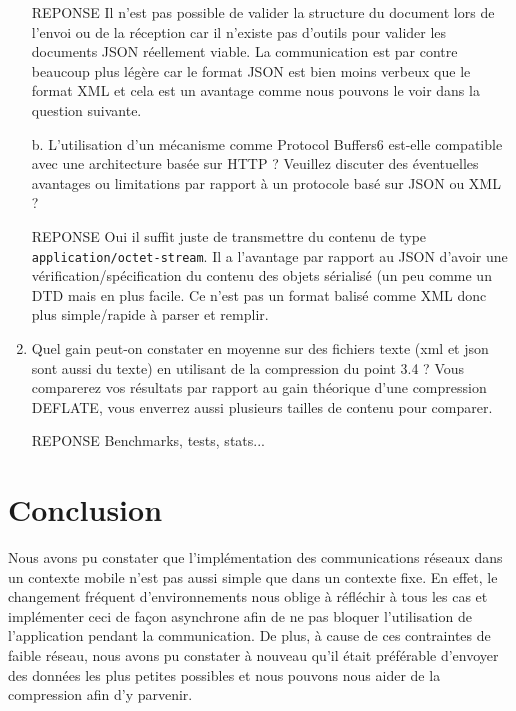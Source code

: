 \documentclass[a4paper]{article}
\begin{document}
\begin{enumerate}
    REPONSE
    Il n'est pas possible de valider la structure du document lors de l'envoi ou de la réception car il n'existe pas d'outils pour valider les documents JSON réellement viable. La communication est par contre beaucoup plus légère car le format JSON est bien moins verbeux que le format XML et cela est un avantage comme nous pouvons le voir dans la question suivante.
    
    b. L’utilisation d’un mécanisme comme Protocol Buffers6 est-elle compatible avec une
    architecture basée sur HTTP ? Veuillez discuter des éventuelles avantages ou limitations par
    rapport à un protocole basé sur JSON ou XML ?
    
    REPONSE
    Oui il suffit juste de transmettre du contenu de type \texttt{application/octet-stream}.
    Il a l'avantage par rapport au JSON d'avoir une vérification/spécification du contenu des objets sérialisé (un peu comme un DTD mais en plus facile. Ce n'est pas un format balisé comme XML donc plus simple/rapide à parser et remplir.
    
    \item Quel gain peut-on constater en moyenne sur des fichiers texte (xml et json sont aussi du texte) en utilisant de la compression du point 3.4 ? Vous comparerez vos résultats par rapport au gain théorique d’une compression DEFLATE, vous enverrez aussi plusieurs tailles de contenu pour comparer.
    
    REPONSE
    Benchmarks, tests, stats...
    
\end{enumerate}

\section{Conclusion}

Nous avons pu constater que l'implémentation des communications réseaux dans un contexte mobile n'est pas aussi simple que dans un contexte fixe. En effet, le changement fréquent d'environnements nous oblige à réfléchir à tous les cas et implémenter ceci de façon asynchrone afin de ne pas bloquer l'utilisation de l'application pendant la communication. De plus, à cause de ces contraintes de faible réseau, nous avons pu constater à nouveau qu'il était préférable d'envoyer des données les plus petites possibles et nous pouvons nous aider de la compression afin d'y parvenir.
\end{document}
